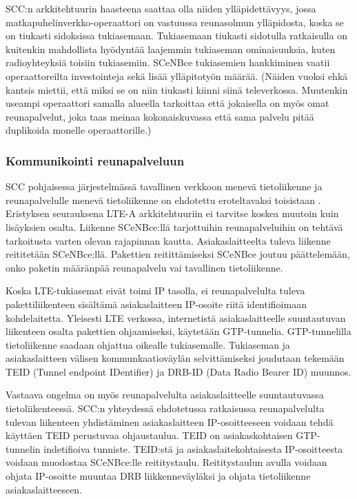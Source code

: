 SCC:n arkkitehtuurin haasteena saattaa olla niiden ylläpidettävyys, jossa matkapuhelinverkko-operaattori on vastuussa reunasolmun ylläpidosta, koska se on tiukasti sidoksissa tukiasemaan\cite{lobillo15scc}.
Tukiasemaan tiukasti sidotulla ratkaisulla on kuitenkin mahdollista hyödyntää laajemmin tukiaseman ominaisuuksia, kuten radioyhteyksiä toisiin tukiasemiin.
SCeNBce tukiasemien hankkiminen vaatii operaattoreilta investointeja sekä lisää ylläpitotyön määrää. (Näiden vuoksi ehkä kantsis miettii, että miksi se on niin tiukasti kiinni siinä televerkossa. Muutenkin useampi operaattori samalla alueella tarkoittaa että jokaisella on myös omat reunapalvelut, joka taas meinaa kokonaiskuvassa että sama palvelu pitää duplikoida monelle operaattorille.)

\subsubsection{Kommunikointi reunapalveluun} \label{GTP}
SCC pohjaisessa järjestelmässä tavallinen verkkoon menevä tietoliikenne ja reunapalvelulle menevä tietoliikenne on ehdotettu eroteltavaksi toisistaan \cite{puente15seamless}.
Eristyksen seurauksena LTE-A arkkitehtuuriin ei tarvitse koskea muutoin kuin lisäyksien osalta. 
Liikenne SCeNBce:llä tarjottuihin reunapalveluihin on tehtävä tarkoitusta varten olevan rajapinnan kautta.
Asiakaslaitteelta tuleva liikenne reititetään SCeNBce:llä. 
Pakettien reitittämiseksi SCeNBce joutuu päättelemään, onko paketin määränpää reunapalvelu vai tavallinen tietoliikenne.

 Koska LTE-tukiasemat eivät toimi IP tasolla, ei reunapalvelulta tuleva pakettiliikenteen sisältämä asiakaslaitteen IP-osoite riitä identifioimaan kohdelaitetta. 
Yleisesti LTE verkossa, internetistä asiakaslaitteelle suuntautuvan liikenteen osalta pakettien ohjaamiseksi, käytetään GTP-tunnelia. GTP-tunnelilla tietoliikenne saadaan ohjattua oikealle tukiasemalle.
Tukiaseman ja asiakaslaitteen välisen kommunkaatioväylän selvittämiseksi joudutaan tekemään TEID (Tunnel endpoint IDentifier) ja DRB-ID (Data Radio Bearer ID) muunnos.

Vastaava ongelma on myös reunapalvelulta asiakaslaitteelle suuntautuvassa tietoliikenteessä.
SCC:n yhteydessä ehdotetussa ratkaisussa reunapalvelulta tulevan liikenteen yhdistäminen asiakaslaitteen IP-osoitteeseen voidaan tehdä käyttäen TEID perustuvaa ohjaustaulua.
TEID on asiakaskohtaisen GTP-tunnelin indetifioiva tunniste.
TEID:stä ja asiakaslaitekohtaisesta IP-osoitteesta voidaan muodostaa SCeNBce:lle reititystaulu. 
Reititystaulun avulla voidaan ohjata IP-osoitte muuntaa DRB liikkenneväyläksi ja ohjata tietoliikenne asiakaslaitteeseen.

